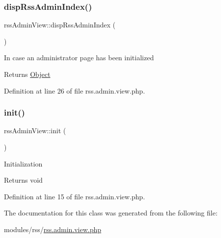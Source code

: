 \subsubsection{\texorpdfstring{disp\+Rss\+Admin\+Index()}{dispRssAdminIndex()}}
{\footnotesize\ttfamily rss\+Admin\+View\+::disp\+Rss\+Admin\+Index (\begin{DoxyParamCaption}{ }\end{DoxyParamCaption})}

In case an administrator page has been initialized

\begin{DoxyReturn}{Returns}
\hyperlink{classObject}{Object} 
\end{DoxyReturn}


Definition at line 26 of file rss.\+admin.\+view.\+php.

\hypertarget{classrssAdminView_a36015edb6e131ff304bff9140cded3aa}{}\label{classrssAdminView_a36015edb6e131ff304bff9140cded3aa} 
\subsubsection{\texorpdfstring{init()}{init()}}
{\footnotesize\ttfamily rss\+Admin\+View\+::init (\begin{DoxyParamCaption}{ }\end{DoxyParamCaption})}

Initialization

\begin{DoxyReturn}{Returns}
void 
\end{DoxyReturn}


Definition at line 15 of file rss.\+admin.\+view.\+php.



The documentation for this class was generated from the following file\+:\begin{DoxyCompactItemize}
\item 
modules/rss/\hyperlink{rss_8admin_8view_8php}{rss.\+admin.\+view.\+php}\end{DoxyCompactItemize}
